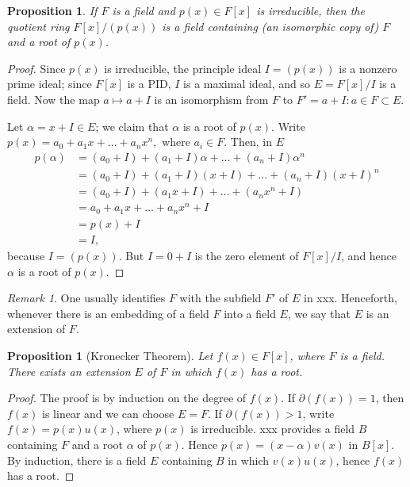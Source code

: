 \documentclass[draft]{article}
\newtheorem{prop}[thm]{Proposition}
\theoremstyle{definition}
\theoremstyle{remark}
\newtheorem{rem}{Remark}[section]
\begin{document}
			\begin{prop}
				If $F$ is a field and $p(x) \in F[x]$ is irreducible, then the quotient ring $F[x]/(p(x))$ is a field containing (an isomorphic copy of) $F$ and a root of $p(x)$.
			\end{prop}
			
			\begin{proof}
				Since $p(x)$ is irreducible, the principle ideal $I = (p(x))$ is a nonzero prime ideal; since $F[x]$ is a PID, $I$ is a maximal ideal, and so $E = F[x]/I$ is a field. Now the map $a \mapsto a + I$ is an isomorphism from $F$ to $F' = {a + I : a \in F} \subset E$.\par
				Let $\alpha = x + I \in E$; we claim that $\alpha$ is a root of $p(x)$. Write $p(x) = a_0 + a_1x + \dots + a_nx^n, \text{ where } a_i \in F$. Then, in $E$
				\begin{align*}
					p(\alpha) &= (a_0 + I) + (a_1 + I)\alpha + \dots + (a_n + I)\alpha^n\\
					&= (a_0 + I) + (a_1 + I)(x + I) + \dots + (a_n + I)(x + I)^n\\
					&= (a_0 + I) + (a_1x + I) + \dots + (a_nx^n + I)\\
					&= a_0 + a_1x + \dots + a_nx^n + I\\
					&= p(x) + I\\
					&= I,
				\end{align*}
				because $I = (p(x))$. But $I = 0 + I$ is the zero element of $F[x]/I$, and hence $\alpha$ is a root of $p(x)$.
			\end{proof}
			
			\begin{rem}
			    One usually identifies $F$ with the subfield $F'$ of $E$ in xxx. Henceforth, whenever there is an embedding of a field $F$ into a field $E$, we say that $E$ is an extension of $F$.
			\end{rem}
			
			\begin{prop}[Kronecker Theorem]
				Let $f(x) \in F[x]$, where $F$ is a field. There exists an extension $E$ of $F$ in which $f(x)$ has a root.
			\end{prop}
			
			\begin{proof}
				The proof is by induction on the degree of $f(x)$. If $\partial(f(x)) = 1$, then $f(x)$ is linear and we can choose $E = F$. If $\partial(f(x)) > 1$, write $f(x) = p(x)u(x)$, where $p(x)$ is irreducible. xxx provides a field $B$ containing $F$ and a root $\alpha$ of $p(x)$. Hence $p(x) = (x - \alpha)v(x)$ in $B[x]$. By induction, there is a field $E$ containing $B$ in which $v(x)u(x)$, hence $f(x)$ has a root.
			\end{proof}
			
\end{document}
